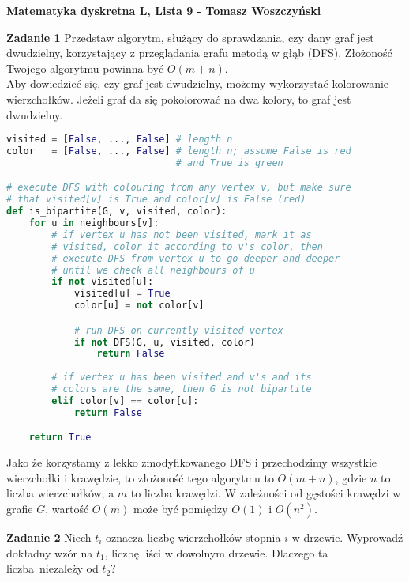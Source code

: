 \documentclass[a4paper,12pt]{article}
\begin{document}
\noindent \textbf{Matematyka dyskretna L, Lista 9 - Tomasz Woszczyński}\newline

\noindent \newline \textbf{Zadanie 1} \newline
Przedstaw algorytm, służący do sprawdzania, czy dany graf jest dwudzielny,
korzystający z przeglądania grafu metodą w głąb (DFS). Złożoność Twojego 
algorytmu powinna być $O(m+n)$. \\

\noindent Aby dowiedzieć się, czy graf jest dwudzielny, możemy wykorzystać 
kolorowanie wierzchołków. Jeżeli graf da się pokolorować na dwa kolory, to
graf jest dwudzielny.

\begin{lstlisting}[style=code, language=python]
visited = [False, ..., False] # length n
color   = [False, ..., False] # length n; assume False is red
                              # and True is green

# execute DFS with colouring from any vertex v, but make sure
# that visited[v] is True and color[v] is False (red)
def is_bipartite(G, v, visited, color):
    for u in neighbours[v]:
        # if vertex u has not been visited, mark it as 
        # visited, color it according to v's color, then
        # execute DFS from vertex u to go deeper and deeper
        # until we check all neighbours of u
        if not visited[u]:
            visited[u] = True
            color[u] = not color[v]

            # run DFS on currently visited vertex
            if not DFS(G, u, visited, color)
                return False
        
        # if vertex u has been visited and v's and its
        # colors are the same, then G is not bipartite
        elif color[v] == color[u]:
            return False

    return True
\end{lstlisting}

\noindent Jako że korzystamy z lekko zmodyfikowanego DFS i przechodzimy wszystkie
wierzchołki i krawędzie, to złożoność tego algorytmu to $O(m + n)$, gdzie $n$ to
liczba wierzchołków, a $m$ to liczba krawędzi. W zależności od gęstości krawędzi
w grafie $G$, wartość $O(m)$ może być pomiędzy $O(1)$ i $O(n^2)$.

\newpage
\noindent \textbf{Zadanie 2} \newline
Niech $t_i$ oznacza liczbę wierzchołków stopnia $i$ w drzewie. Wyprowadź dokładny
wzór na $t_1$, liczbę liści w dowolnym drzewie. Dlaczego ta liczba niezależy od $t_2$? \\
\end{document}
